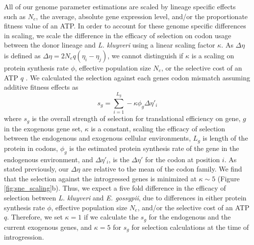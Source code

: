 \documentclass{bmcart}
\newcommand{\kluyveri}{\textit{L. kluyveri}\xspace}
\newcommand{\gossypii}{\textit{E. gossypii}\xspace}
\newcommand{\DE}{\ensuremath{{\Delta \eta}}\xspace}
\newcommand{\Ne}{\ensuremath{N_e}\xspace}
\begin{document}
All of our genome parameter estimations are scaled by lineage specific effects such as \Ne, the average, absolute gene expression level, and/or the proportionate fitness value of an ATP.
In order to account for these genome specific differences in scaling, we scale the difference in the efficacy of selection on codon usage between the donor lineage and \kluyveri using a linear scaling factor $\kappa$.
As \DE is defined as $\DE = 2\Ne q(\eta_i-\eta_j)$, we cannot distinguish if $\kappa$ is a scaling on protein synthesis rate $\phi$, effective population size $\Ne$, or the selective cost of an ATP $q$ \citep{gilchrist2007, gilchrist2015}.
We calculated the selection against each genes codon mismatch assuming additive fitness effects as 
\begin{equation}
s_g = \sum_{i=1}^{L_g} -\kappa \phi_g \DE'_i
\label{equ:sg}
\end{equation}
where $s_g$ is the overall strength of selection for translational efficiency on gene, $g$  in the exogenous gene set, $\kappa$ is a constant, scaling the efficacy of selection between the endogenous and exogenous cellular environments, $L_{g}$ is length of the protein in codons, $\phi_g$ is the estimated protein synthesis rate of the gene in the endogenous environment, and $\DE'_i$, is the $\DE'$ for the codon at position $i$.
As stated previously, our \DE are relative to the mean of the codon family.
We find that the selection against the introgressed genes is minimized at $\kappa \sim 5$ (Figure \ref{fig:sne_scaling}b).
Thus, we expect a five fold difference in the efficacy of selection between \kluyveri and \gossypii, due to differences in either protein synthesis rate $\phi$, effective population size $\Ne$, and/or the selective cost of an ATP $q$.
Therefore, we set $\kappa = 1$ if we calculate the $s_g$ for the endogenous and the current exogenous genes, and $\kappa = 5$ for $s_g$ for selection calculations at the time of introgression.
\end{document}
